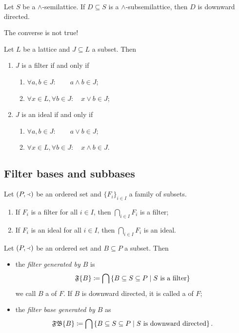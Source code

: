 \begin{lemma}
Let $S$ be a $\wedge$-semilattice. If $D\subseteq S$ is a $\wedge$-subsemilattice, then $D$ is downward directed.
\end{lemma}
The converse is not true!

\begin{lemma}
Let $L$ be a lattice and $J\subseteq L$ a subset. Then
\begin{enumerate}
\item $J$ is a filter \textup{if and only if}
\begin{enumerate}
\item $\forall a,b\in J: \qquad a\wedge b\in J$;
\item $\forall x\in L, \forall b\in J: \quad x\vee b \in J$;
\end{enumerate}
\item $J$ is an ideal \textup{if and only if}
\begin{enumerate}
\item $\forall a,b\in J: \qquad a\vee b\in J$;
\item $\forall x\in L, \forall b\in J: \quad x\wedge b \in J$.
\end{enumerate}
\end{enumerate}
\end{lemma}

\subsection{Filter bases and subbases}

\begin{lemma}
Let $\left( P,\Yleft \right)$ be an ordered set and $\{F_i\}_{i\in I}$ a family of subsets.
\begin{enumerate}
\item If $F_i$ is a filter for all $i\in I$, then $\bigcap_{i\in I}F_i$ is a filter;
\item If $F_i$ is an ideal for all $i\in I$, then $\bigcap_{i\in I}F_i$ is an ideal.
\end{enumerate}
\end{lemma}

\begin{definition}
Let $\left( P,\Yleft \right)$ be an ordered set and $B\subseteq P$ a subset. Then
\begin{itemize}
\item the \emph{filter generated by $B$} is
\[ \mathfrak{F}\{B\} \coloneqq \bigcap\left\{ B \subseteq S\subseteq P \;\middle|\; \text{$S$ is a filter} \right\} \]
we call $B$ a  of $F$. If $B$ is downward directed, it is called a  of $F$;
\item the \emph{filter base generated by $B$} as
\[ \mathfrak{FB}\{B\} \coloneqq \bigcap\left\{ B \subseteq S\subseteq P \;\middle|\; \text{$S$ is downward directed} \right\}. \]
\end{itemize}
\end{definition}

